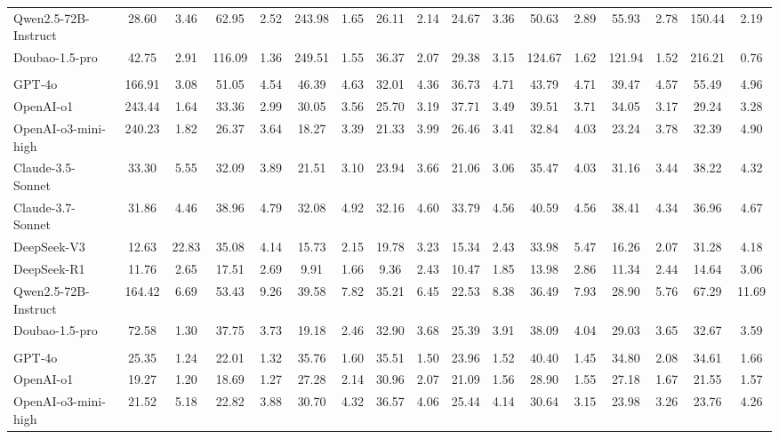 \documentclass[11pt, a4paper, logo, copyright, nonumbering]{seed}
\newcommand{\msweagent}{MSWE-agent\xspace}
\newcommand{\mopenhands}{MopenHands\xspace}
\begin{document}
\begin{table}[t]
{\begin{tabular}{l|cc|cc|cc|cc|cc|cc|cc|cc}
    Qwen2.5-72B-Instruct & 28.60 & 3.46 & 62.95 & 2.52 & 243.98 & 1.65 & 26.11 & 2.14 & 24.67 & 3.36 & 50.63 & 2.89 & 55.93 & 2.78 & 150.44 & 2.19\\
    Doubao-1.5-pro & 42.75 & 2.91 & 116.09 & 1.36 & 249.51 & 1.55 & 36.37 & 2.07 & 29.38 & 3.15 & 124.67 & 1.62 & 121.94 & 1.52 & 216.21 & 0.76\\
    \midrule
    \rowcolor{mygray}\multicolumn{17}{c}{\textbf{\msweagent}} \\
    GPT‑4o & 166.91 & 3.08 & 51.05 & 4.54 & 46.39 & 4.63 & 32.01 & 4.36 & 36.73 & 4.71 & 43.79 & 4.71 & 39.47 & 4.57 & 55.49 & 4.96\\
    OpenAI-o1 & 243.44 & 1.64 & 33.36 & 2.99 & 30.05 & 3.56 & 25.70 & 3.19 & 37.71 & 3.49 & 39.51 & 3.71 & 34.05 & 3.17 & 29.24 & 3.28\\
    OpenAI-o3-mini-high & 240.23 & 1.82 & 26.37 & 3.64 & 18.27 & 3.39 & 21.33 & 3.99 & 26.46 & 3.41 & 32.84 & 4.03 & 23.24 & 3.78 & 32.39 & 4.90\\
    Claude-3.5-Sonnet & 33.30 & 5.55 & 32.09 & 3.89 & 21.51 & 3.10 & 23.94 & 3.66 & 21.06 & 3.06 & 35.47 & 4.03 & 31.16 & 3.44 & 38.22 & 4.32\\
    Claude-3.7-Sonnet & 31.86 & 4.46 & 38.96 & 4.79 & 32.08 & 4.92 & 32.16 & 4.60 & 33.79 & 4.56 & 40.59 & 4.56 & 38.41 & 4.34 & 36.96 & 4.67\\
    DeepSeek-V3 & 12.63 & 22.83 & 35.08 & 4.14 & 15.73 & 2.15 & 19.78 & 3.23 & 15.34 & 2.43 & 33.98 & 5.47 & 16.26 & 2.07 & 31.28 & 4.18\\
    DeepSeek-R1 & 11.76 & 2.65 & 17.51 & 2.69 & 9.91 & 1.66 & 9.36 & 2.43 & 10.47 & 1.85 & 13.98 & 2.86 & 11.34 & 2.44 & 14.64 & 3.06\\
    Qwen2.5-72B-Instruct & 164.42 & 6.69 & 53.43 & 9.26 & 39.58 & 7.82 & 35.21 & 6.45 & 22.53 & 8.38 & 36.49 & 7.93 & 28.90 & 5.76 & 67.29 & 11.69\\
    Doubao-1.5-pro & 72.58 & 1.30 & 37.75 & 3.73 & 19.18 & 2.46 & 32.90 & 3.68 & 25.39 & 3.91 & 38.09 & 4.04 & 29.03 & 3.65 & 32.67 & 3.59\\
    \midrule
    \rowcolor{mygray}\multicolumn{17}{c}{\textbf{\mopenhands}} \\
    GPT‑4o & 25.35 & 1.24 & 22.01 & 1.32 & 35.76 & 1.60 & 35.51 & 1.50 & 23.96 & 1.52 & 40.40 & 1.45 & 34.80 & 2.08 & 34.61 & 1.66\\
    OpenAI-o1 & 19.27 & 1.20 & 18.69 & 1.27 & 27.28 & 2.14 & 30.96 & 2.07 & 21.09 & 1.56 & 28.90 & 1.55 & 27.18 & 1.67 & 21.55 & 1.57\\
    OpenAI-o3-mini-high & 21.52 & 5.18 & 22.82 & 3.88 & 30.70 & 4.32 & 36.57 & 4.06 & 25.44 & 4.14 & 30.64 & 3.15 & 23.98 & 3.26 & 23.76 & 4.26\\

\end{tabular}}
\end{table}
\end{document}
